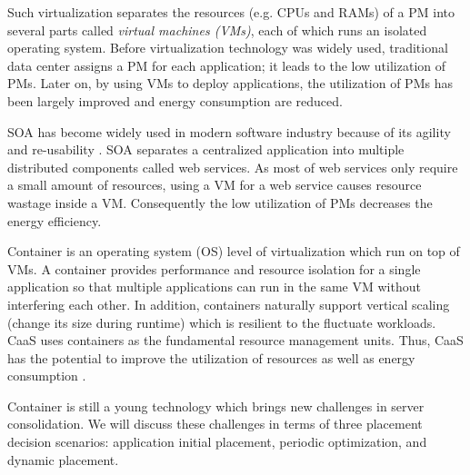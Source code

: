  Such virtualization separates the resources (e.g. CPUs and RAMs) of a PM into several parts called \emph{virtual machines (VMs)}, each of which runs an isolated operating system. Before virtualization technology was widely used, traditional data center assigns a PM for each application; it leads to the low utilization of PMs. Later on, by using VMs to deploy applications, the utilization of PMs has been largely improved and energy consumption are reduced. 

 SOA has become widely used in modern software industry because of its agility and re-usability \cite{}. SOA separates a centralized application into multiple distributed components called web services. As most of web services only require a small amount of resources,  using a VM for a web service causes resource wastage inside a VM. Consequently the low utilization of PMs decreases the energy efficiency. 


 Container is an operating system (OS) level of virtualization which run on top of VMs. A container provides performance and resource isolation for a single application so that multiple applications can run in the same VM without interfering each other. In addition, containers naturally support vertical scaling (change its size during runtime)\cite{} which is resilient to the fluctuate workloads.  CaaS uses containers as the fundamental resource management units. Thus, CaaS has the potential to improve the utilization of resources as well as energy consumption \cite{Esposito:2016br}. 







Container is still a young technology which brings new challenges in server consolidation. We will discuss these challenges in terms of three placement decision scenarios: application initial placement, periodic optimization, and dynamic placement.

